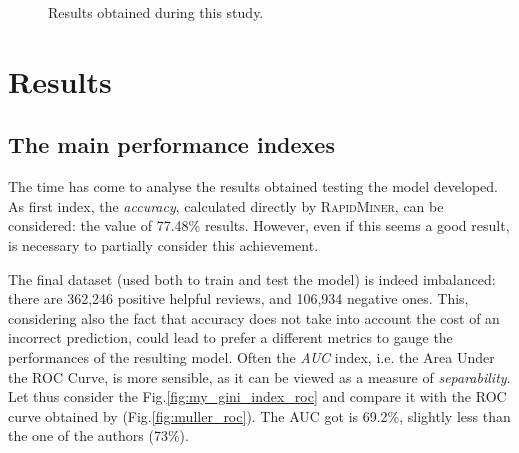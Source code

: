 \documentclass[a4paper]{article}
\begin{document}
		\begin{figure}[p]
			\centering
			\quad
			\caption{Results obtained during this study.}
			\label{fig:my_results}
		\end{figure}
	
		 			 	
	\section{Results}
		\subsection{The main performance indexes}
			The time has come to analyse the results obtained testing the model developed. As first index, the \emph{accuracy}, calculated directly by \textsc{RapidMiner}, can be considered: the value of 77.48\% results.	However, even if this seems a good result, is necessary to partially consider this achievement.
			
			The final dataset (used both to train and test the model) is indeed imbalanced: there are 362,246 positive helpful reviews, and 106,934 negative ones. This, considering also the fact that accuracy does not take into account the cost of an incorrect prediction, could lead to prefer a different metrics to gauge the performances of the resulting model. Often the \emph{AUC} index, i.e. the Area Under the ROC Curve, is more sensible, as it can be viewed as a measure of \emph{separability}. Let thus consider the Fig.\autoref{fig:my_gini_index_roc} and compare it with the ROC curve obtained by \citeauthor{article:muller} (Fig.\autoref{fig:muller_roc}). The AUC got is 69.2\%, slightly less than the one of the authors (73\%).
			
\end{document}
